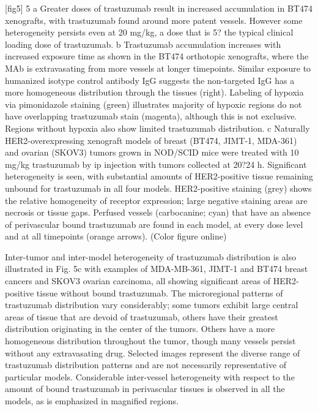 [fig5]
5
a Greater doses of trastuzumab result in increased accumulation in BT474 xenografts, with trastuzumab found around more patent vessels.
However some heterogeneity persists even at 20 mg/kg, a dose that is 5? the typical clinical loading dose of trastuzumab.
b Trastuzumab accumulation increases with increased exposure time as shown in the BT474 orthotopic xenografts, where the MAb is extravasating from more vessels at longer timepoints.
Similar exposure to humanized isotype control antibody IgG suggests the non-targeted IgG has a more homogeneous distribution through the tissues (right).
Labeling of hypoxia via pimonidazole staining (green) illustrates majority of hypoxic regions do not have overlapping trastuzumab stain (magenta), although this is not exclusive.
Regions without hypoxia also show limited trastuzumab distribution.
c Naturally HER2-overexpressing xenograft models of breast (BT474, JIMT-1, MDA-361) and ovarian (SKOV3) tumors grown in NOD/SCID mice were treated with 10 mg/kg trastuzumab by ip injection with tumors collected at 20?24 h.
Significant heterogeneity is seen, with substantial amounts of HER2-positive tissue remaining unbound for trastuzumab in all four models.
HER2-positive staining (grey) shows the relative homogeneity of receptor expression; large negative staining areas are necrosis or tissue gaps.
Perfused vessels (carbocanine; cyan) that have an absence of perivascular bound trastuzumab are found in each model, at every dose level and at all timepoints (orange arrows).
(Color figure online)

Inter-tumor and inter-model heterogeneity of trastuzumab distribution is also illustrated in Fig.
5c with examples of MDA-MB-361, JIMT-1 and BT474 breast cancers and SKOV3 ovarian carcinoma, all showing significant areas of HER2-positive tissue without bound trastuzumab.
The microregional patterns of trastuzumab distribution vary considerably; some tumors exhibit large central areas of tissue that are devoid of trastuzumab, others have their greatest distribution originating in the center of the tumors.
Others have a more homogeneous distribution throughout the tumor, though many vessels persist without any extravasating drug.
Selected images represent the diverse range of trastuzumab distribution patterns and are not necessarily representative of particular models.
Considerable inter-vessel heterogeneity with respect to the amount of bound trastuzumab in perivascular tissues is observed in all the models, as is emphasized in magnified regions.

